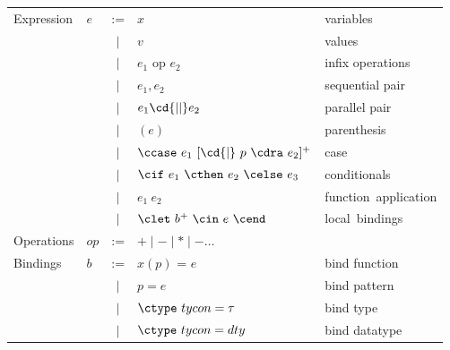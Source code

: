 \begin{definition}
\begin{tabular}{llcll}
Expression  & $e$ 
& := & $x$ & variables
\\
& & $\mid$ & $v$ & values
\\
& & $\mid$ & $e_1$ op $e_2$ & infix operations
\\
& & $\mid$ & $e_1, e_2$ & sequential pair
\\
& & $\mid$ & $e_1 \cd{||} e_2$ & parallel pair
\\
& & $\mid$ & $( e )$ & parenthesis
\\
& & $\mid$ & $\ccase~e_1~[\cd{|}~p~\cdra~e_2]^+$  & case
\\
& & $\mid$ & $\cif~e_1~\cthen~e_2~\celse~e_3$  & conditionals
\\
& & $\mid$ & $e_1~e_2$ & \mbox{function application}
\\
& & $\mid$ & $\clet~b^+~\cin~e~\cend$ & \mbox{local bindings}
\\

Operations & $op$ & := & $+ \mid - \mid * \mid - \ldots$
\\

Bindings &  $b$ & := & 
$x ( p )$ = $e$ & bind function
\\
&  & $\mid$ & $p = e$ & bind pattern
\\
&  & $\mid$ & $\ctype~tycon = \tau$ & bind type 
\\
&  & $\mid$ & $\ctype~tycon = dty$ & bind datatype
\\

\end{tabular}

\end{definition}

